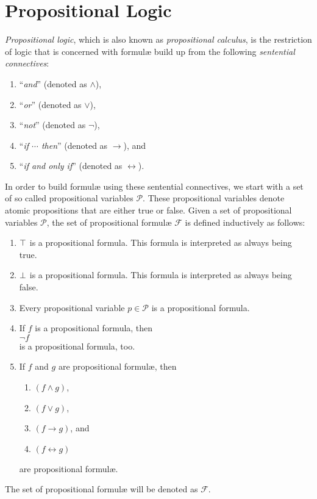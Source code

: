 \chapter{Propositional Logic}
\emph{Propositional logic}, which is also known as \emph{propositional calculus},
is the restriction of logic that is concerned with {formul\ae} build up from the following 
\emph{sentential connectives}:  
\begin{enumerate}
\item ``\emph{and}'' (denoted as $\wedge$),
\item ``\emph{or}''  (denoted as $\vee$),
\item ``\emph{not}'' (denoted as $\neg$),
\item ``\emph{if $\cdots$ then}'' (denoted as $\rightarrow$), and
\item ``\emph{if and only if}'' (denoted as $\leftrightarrow$). 
\end{enumerate}
In order to build {formul\ae} using these sentential connectives, we start with a set of
so called propositional variables $\mathcal{P}$.  These propositional variables denote atomic propositions
that are either true or false.  Given a set of propositional variables $\mathcal{P}$, the set of
propositional {formul\ae} $\mathcal{F}$ is defined inductively as follows:
\begin{enumerate}
\item $\top$ is a propositional formula.  This formula is interpreted as always being true.
\item $\bot$ is a propositional formula.  This formula is interpreted as always being false.
\item Every propositional variable $p \in \mathcal{P}$ is a propositional formula.
\item If $f$ is a propositional formula, then
      \\[0.2cm]
      \hspace*{1.3cm}
      $\neg f$
      \\[0.2cm]
      is a propositional formula, too.
\item If $f$ and $g$ are propositional {formul\ae}, then 
      \begin{enumerate}
      \item $(f \wedge g)$,
      \item $(f \vee g)$,
      \item $(f \rightarrow g)$, and
      \item $(f \leftrightarrow g)$
      \end{enumerate}
      are propositional {formul\ae}.
\end{enumerate}
The set of propositional {formul\ae} will be denoted as $\mathcal{F}$.

